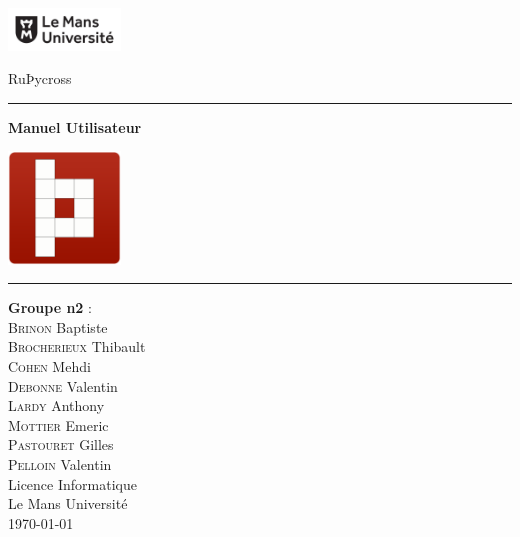 \documentclass[a4paper, 12pt]{report}
\begin{document}
\begin{titlepage}



	\begin{spacing}{1.5}
			\begin{minipage}{0.4\textwidth}
					\includegraphics[width=3cm]{logo.png}
			\end{minipage}
			\begin{minipage}{0.5\textwidth}\raggedleft
					RuÞycross\\
			\end{minipage}
						\vspace*{\fill}

	\end{spacing}



	\begin{center}
		\begin{spacing}{2}
		    \hrule \vspace{1cm}
			\textbf{\huge Manuel Utilisateur}\\
			\vspace{1cm}
			\begin{minipage}{0.4\textwidth}
					\centerline{\includegraphics[width=3cm]{test_logo_2.png}}
			\end{minipage}
			\vspace{1cm}
			\hrule

			\vspace*{\fill}


		\end{spacing}

		\begin{spacing}{1.15}
			\large\textbf{Groupe n\up{o}2} :\\
			\large
			\textsc{Brinon} Baptiste\\
			\textsc{Brocherieux} Thibault\\
			\textsc{Cohen} Mehdi\\
			\textsc{Debonne} Valentin\\
			\textsc{Lardy} Anthony\\
			\textsc{Mottier} Emeric\\
			\textsc{Pastouret} Gilles\\
			\textsc{Pelloin} Valentin\\
			\vspace*{\fill}
			\textnormal{\large Licence Informatique\\ Le Mans Université\\ \today}
		\end{spacing}


\end{center}
\end{titlepage}
\end{document}
